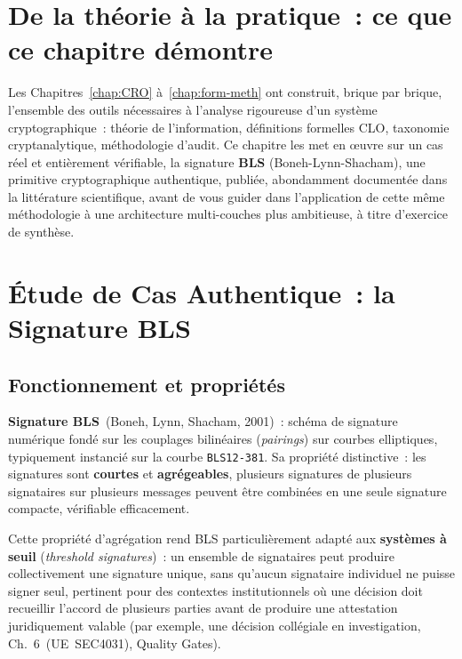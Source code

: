 \bigskip

\section*{De la théorie à la pratique~: ce que ce chapitre démontre}

Les Chapitres~\ref{chap:CRO} à~\ref{chap:form-meth} ont construit,
brique par brique, l'ensemble des outils nécessaires à l'analyse
rigoureuse d'un système cryptographique~: théorie de l'information,
définitions formelles CLO, taxonomie cryptanalytique, méthodologie
d'audit. Ce chapitre les met en \oe uvre sur un cas réel et entièrement
vérifiable, la signature \textbf{BLS} (Boneh-Lynn-Shacham), une
primitive cryptographique authentique, publiée, abondamment
documentée dans la littérature scientifique, avant de vous guider
dans l'application de cette même méthodologie à une architecture
multi-couches plus ambitieuse, à titre d'exercice de synthèse.

\separateur

\section{Étude de Cas Authentique~: la Signature BLS}
\label{sec:etude-bls}

\subsection{Fonctionnement et propriétés}

\begin{boxdef}
\textbf{Signature BLS}~(Boneh, Lynn, Shacham,
2001)~: schéma de signature numérique fondé sur les couplages
bilinéaires (\textit{pairings}) sur courbes elliptiques, typiquement
instancié sur la courbe \texttt{BLS12-381}. Sa propriété distinctive~:
les signatures sont \textbf{courtes} et
\textbf{agrégeables}, plusieurs signatures de plusieurs signataires
sur plusieurs messages peuvent être combinées en une seule signature
compacte, vérifiable efficacement.
\end{boxdef}

Cette propriété d'agrégation rend BLS particulièrement adapté aux
\textbf{systèmes à seuil} (\textit{threshold signatures})~: un
ensemble de signataires peut produire collectivement une signature
unique, sans qu'aucun signataire individuel ne puisse signer seul, pertinent pour des contextes institutionnels où une décision
doit recueillir l'accord de plusieurs parties avant de produire
une attestation juridiquement valable (par exemple, une décision
collégiale en investigation, Ch.~6~(UE~SEC4031), Quality Gates).

